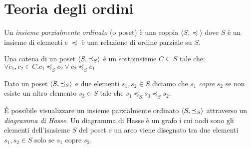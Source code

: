 \section{Teoria degli ordini}
\begin{definition}
Un \textit{insieme parzialmente ordinato} (o poset) è una coppia \(\langle S, \preceq\rangle\) dove \(S\) è un insieme di elementi e \(\preceq\) è una relazione di ordine parziale su \(S\).
\end{definition}

\begin{definition}[Catena]
Una catena di un poset \(\langle S, \preceq_{S}\rangle\) è un sottoinsieme \(C\subseteq S\) tale che: \(\forall c_1, c_2 \in C. c_1\preceq_{S} c_2 \vee c_2\preceq_{S} c_1\)
\end{definition}

\begin{definition}[Copertura]
Dato un poset \(\langle S, \preceq_{S}\rangle\) e due elementi \(s_1, s_2 \in S\) diciamo che \(s_1\) \textit{copre} \(s_2\) se non esiste un altro elemento \(s_3\in S\) tale che \(s_1 \preceq_{S} s_3 \preceq_{S} s_2\).
\end{definition}

\begin{definition}
\'E possibile visualizzare un insieme parzialmente ordinato \(\langle S, \preceq_{S}\rangle\) attraverso un \textit{diagramma di Hasse}. Un diagramma di Hasse è un grafo i cui nodi sono gli elementi dell'isnsieme \(S\) del poset e un arco viene disegnato tra due elementi \(s_1, s_2 \in S\) solo se \(s_1\) copre \(s_2\).
\end{definition}

